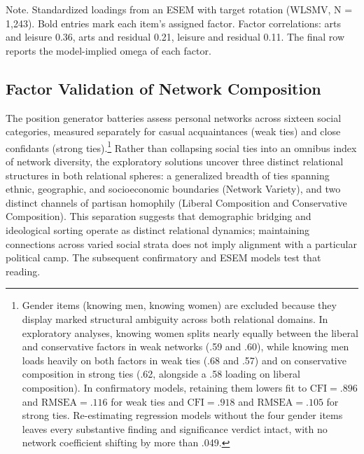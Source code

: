 \documentclass[
  12pt
]{article}
\begin{document}
Note. Standardized loadings from an ESEM with target rotation (WLSMV, N = 1,243). Bold entries mark each item's assigned factor. Factor correlations: arts and leisure 0.36, arts and residual 0.21, leisure and residual 0.11. The final row reports the model-implied omega of each factor.


\subsection{Factor Validation of Network Composition}\label{factor-validation-of-network-composition}

The position generator batteries assess personal networks across sixteen social categories, measured separately for casual acquaintances (weak ties) and close confidants (strong ties).\footnote{Gender items (knowing men, knowing women) are excluded because they display marked structural ambiguity across both relational domains. In exploratory analyses, knowing women splits nearly equally between the liberal and conservative factors in weak networks (.59 and .60), while knowing men loads heavily on both factors in weak ties (.68 and .57) and on conservative composition in strong ties (.62, alongside a .58 loading on liberal composition). In confirmatory models, retaining them lowers fit to $\text{CFI} = .896$ and $\text{RMSEA} = .116$ for weak ties and $\text{CFI} = .918$ and $\text{RMSEA} = .105$ for strong ties. Re-estimating regression models without the four gender items leaves every substantive finding and significance verdict intact, with no network coefficient shifting by more than .049.} Rather than collapsing social ties into an omnibus index of network diversity, the exploratory solutions uncover three distinct relational structures in both relational spheres: a generalized breadth of ties spanning ethnic, geographic, and socioeconomic boundaries (Network Variety), and two distinct channels of partisan homophily (Liberal Composition and Conservative Composition). This separation suggests that demographic bridging and ideological sorting operate as distinct relational dynamics; maintaining connections across varied social strata does not imply alignment with a particular political camp. The subsequent confirmatory and ESEM models test that reading.
\end{document}
